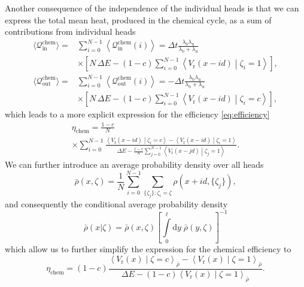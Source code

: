 \documentclass[aps,pre,twocolumn,showpacs,showkeys,superscriptaddress,floatfix]{revtex4-1}
\newcommand{\rmd}{{\mathrm d}}
\begin{document}
Another consequence of the independence of the individual heads 
is that we can express the total mean heat, produced in the chemical cycle, as a sum of contributions from individual heads
\begin{align*}
\langle \mathcal Q_\text{in}^\text{chem} \rangle 
=& \sum\limits_{i=0}^{N-1} \left\langle \mathcal Q_\text{in}^\text{chem}(i) \right\rangle 
= \Delta t \frac{ \lambda_\text{b} \lambda_\text{u} }{ \lambda_\text{b} + \lambda_\text{u} } 
\\ &\times
\left[ N \, \Delta E 
- (1-c) \sum\limits_{i=0}^{N-1} \left\langle V_\text{r}(x - i d ) \middle| \zeta_i = 1 \right\rangle 
\right] ,  
\\
\langle \mathcal Q^\text{chem}_\text{out} \rangle 
=& \sum\limits_{i=0}^{N-1} \left\langle \mathcal Q_\text{out}^\text{chem}(i) \right\rangle 
= - \Delta t \frac{ \lambda_\text{b} \lambda_\text{u} }{ \lambda_\text{b} + \lambda_\text{u} } 
\\ &\times
\left[ N \, \Delta E 
- (1-c) \sum\limits_{i=0}^{N-1} \left\langle V_\text{r}(x - i d ) \middle| \zeta_i = c \right\rangle  
\right] , 
\end{align*}
which leads to a more explicit expression for the efficiency \eqref{eq:efficiency} 
\begin{multline*}
\eta_\text{chem} = \frac{1-c}{N}
\\ \times
\sum\limits_{i=0}^{N-1} \frac{ \left\langle V_\text{r}(x-id) \middle| \zeta_i = c \right\rangle - \left\langle V_\text{r}( x -id ) \middle| \zeta_i = 1 \right\rangle }
{ \Delta E - \frac{1-c}{N} \sum\limits_{j=0}^{N-1} \left\langle V_\text{r}(x-jd) \middle| \zeta_j = 1 \right\rangle } 
. 
\end{multline*}
We can further introduce an average probability density over all heads 
\begin{equation}
\bar{\rho}(x,\zeta) = \frac{1}{N} \sum\limits_{i=0}^{N-1} \sum\limits_{ \{ \zeta_j \} : \zeta_i = \zeta } \rho( x + i d, \{ \zeta_j \} ) ,
\label{eq:eff_distribution}
\end{equation}
and consequently the conditional average probability density
\begin{equation}
\bar{\rho}(x|\zeta) = \bar{\rho}(x,\zeta) \left[ \int\limits_0^\ell \rmd y \; \bar{\rho}(y,\zeta) \right]^{-1}
\label{eq:cond_prob}
\end{equation}
which allow us to further simplify the expression for the chemical efficiency to 
\begin{equation}
\eta_\text{chem} = (1-c)
\frac{ \left\langle V_\text{r}(x) \middle| \zeta = c \right\rangle_{\bar{\rho}} - \left\langle V_\text{r}(x) \middle| \zeta = 1 \right\rangle_{\bar{\rho}} }
{ \Delta E - (1-c) \left\langle V_\text{r}(x) \middle| \zeta = 1 \right\rangle_{\bar{\rho}} } 
. 
\label{eq:eta}
\end{equation}
\end{document}
